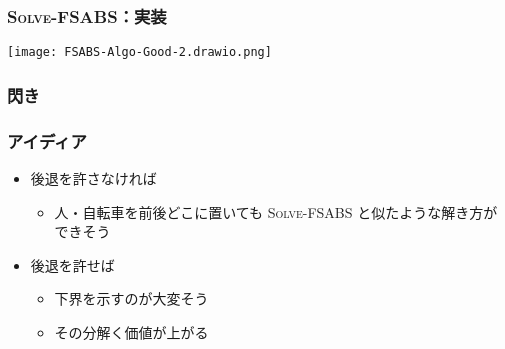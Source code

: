 \documentclass[dvipdfmx,12pt]{beamer}
\begin{document}
\begin{frame}
  \frametitle{\textsc{Solve-FSABS}：実装}
  \centering\hspace{15pt}\texttt{[image: FSABS-Algo-Good-2.drawio.png]}
\end{frame}

\begin{frame}
  \frametitle{閃き}
\end{frame}

\begin{frame}
  \frametitle{アイディア}
  \begin{itemize}
  \item<2-> 後退を許さなければ
    \begin{itemize}
    \item<3-> 人・自転車を前後どこに置いても \textsc{Solve-FSABS} と似たような解き方ができそう
    \end{itemize}
    \vspace{10pt}
  \item<4-> 後退を許せば
    \begin{itemize}
    \item<5-> 下界を示すのが大変そう
    \item<6-> その分解く価値が上がる
    \end{itemize}
  \end{itemize}
\end{frame}

\begin{frame}
\end{frame}
\end{document}
